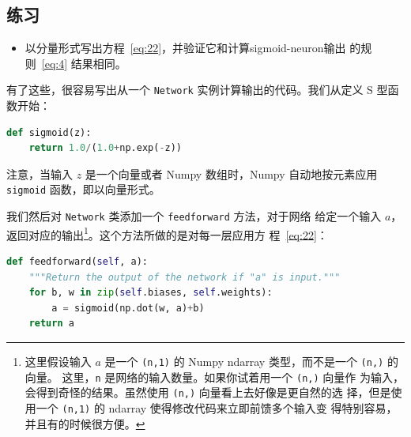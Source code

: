 \subsection*{练习}

\begin{itemize}
\item 以分量形式写出方程~\eqref{eq:22}，并验证它和计算\gls*{sigmoid-neuron}输出
  的规则~\eqref{eq:4} 结果相同。
\end{itemize}

有了这些，很容易写出从一个 \lstinline!Network! 实例计算输出的代码。我们从定义 S
型函数开始：
\begin{lstlisting}[language=Python]
def sigmoid(z):
    return 1.0/(1.0+np.exp(-z))
\end{lstlisting}

注意，当输入 $z$ 是一个向量或者 Numpy 数组时，Numpy 自动地按元素应用
\lstinline!sigmoid! 函数，即以向量形式。

我们然后对 \lstinline!Network! 类添加一个 \lstinline!feedforward! 方法，对于网络
给定一个输入 $a$，返回对应的输出\footnote{这里假设输入 $a$ 是一个
  \lstinline!(n,1)! 的 Numpy ndarray 类型，而不是一个 \lstinline!(n,)! 的向量。
  这里，\lstinline!n! 是网络的输入数量。如果你试着用一个 \lstinline!(n,)! 向量作
  为输入，会得到奇怪的结果。虽然使用 \lstinline!(n,)! 向量看上去好像是更自然的选
  择，但是使用一个 \lstinline!(n,1)! 的 ndarray 使得修改代码来立即前馈多个输入变
  得特别容易，并且有的时候很方便。}。这个方法所做的是对每一层应用方
程~\eqref{eq:22}：
\begin{lstlisting}[language=Python]
def feedforward(self, a):
    """Return the output of the network if "a" is input."""
    for b, w in zip(self.biases, self.weights):
        a = sigmoid(np.dot(w, a)+b)
    return a
\end{lstlisting}


